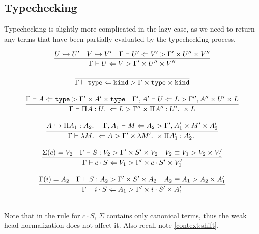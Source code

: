\subsection{Typechecking}

Typechecking is slightly more complicated in the lazy case, as
we need to return any terms that have been partially evaluated
by the typechecking process.

\bigskip 
{}
\bigskip 

$$
\begin{array}{c}
\infer{\LzCheckTy{U}{V}{\Gamma'}{U''}{V''}}{U\Weak U' & V\Weak V' & \LzCheckTy{U'}{V'}{\Gamma'}{U''}{V''}}\\\\
\infer{\LzCheckTy{\Type}{\Kind}{\Gamma}{\Type}{\Kind}}{} \\\\
\infer{\LzCheckTy{\PiTyp{A}{U}}{L}{\Gamma''}{\PiTyp{A''}{U'}}{L}}{\LzCheckTy{A}{\Type}{\Gamma'}{A'}{\Type} & \LzCheckTy[\Gamma',A']{U}{L}{\Gamma'',A''}{U'}{L}} \\\\
\infer{\LzCheckTy{\Lam{M}}{A}{\Gamma'}{\Lam{M'}}{\PiTyp{A_1'}{A_2'}}}{A\Weak \PiTyp{A_1}{A_2} & \LzCheckTy[\Gamma,A_1]{M}{A_2}{\Gamma',A_1'}{M'}{A_2'}} \\\\
\infer{\LzCheckTy{c\cdot S}{V_1}{\Gamma'}{c\cdot S'}{V_1'}}{\Sigma(c) = V_2 & \LzFocus{S}{V_2}{\Gamma'}{S'}{V_2} & \LzEquiv{V_2}{V_1}{V_2}{V_1'}} \\\\
\infer{\LzCheckTy{i\cdot S}{A_1}{\Gamma'}{i\cdot S'}{A_1'}}{\Gamma(i) = A_2 & \LzFocus{S}{A_2}{\Gamma'}{S'}{A_2} & \LzEquiv{A_2}{A_1}{A_2}{A_1'}} \\\\
\end{array} 
$$

Note that in the rule for $c\cdot S$, $\Sigma$ contains only canonical terms,
thus the weak head normalization does not affect it.
Also recall note \ref{context:shift}.

\bigskip 
{}
\bigskip 

